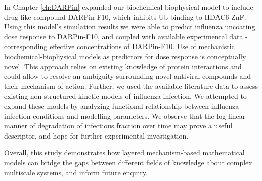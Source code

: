 In Chapter \ref{ch:DARPin} expanded our biochemical-biophysical model to include drug-like compound DARPin-F10, which inhibits Ub binding to HDAC6-ZnF. Using this model's simulation results we were able to predict influenza uncoating dose response to DARPin-F10, and coupled with available experimental data - corresponding effective concentrations of DARPin-F10. Use of mechanistic biochemical-biophysical models as predictors for dose response is conceptually novel. This approach relies on existing knowledge of protein interactions and could allow to resolve an ambiguity surrounding novel antiviral compounds and their mechanism of action. Further, we used the available literature data \cite{rudiger2019multiscale, schulze2009infection} to assess existing non-structured kinetic models of influenza infection. We attempted to expand these models by analyzing functional relationship between influenza infection conditions and modelling parameters. We observe that the log-linear manner of degradation of infectious fraction over time may prove a useful descriptor, and hope for further experimental investigation. 

Overall, this study demonstrates how layered mechanism-based mathematical models can bridge the gaps between different fields of knowledge about complex multiscale systems, and inform future enquiry.